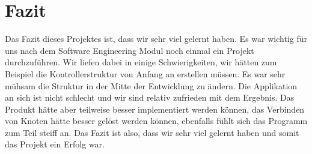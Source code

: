 \chapter{Fazit}
\label{chap:fazit}
Das Fazit dieses Projektes ist, dass wir sehr viel gelernt haben. Es war wichtig für uns nach dem Software Engineering Modul noch einmal ein Projekt durchzuführen. Wir liefen dabei in einige Schwierigkeiten, wir hätten zum Beispiel die Kontrollerstruktur von Anfang an erstellen müssen. Es war sehr mühsam die Struktur in der Mitte der Entwicklung zu ändern. Die Applikation an sich ist nicht schlecht und wir sind relativ zufrieden mit dem Ergebnis. Das Produkt hätte aber teilweise besser implementiert werden können, das Verbinden von Knoten hätte besser gelöst werden können, ebenfalls fühlt sich das Programm zum Teil steiff an. Das Fazit ist also, dass wir sehr viel gelernt haben und somit das Projekt ein Erfolg war.